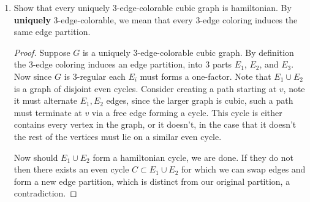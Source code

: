 \documentclass[12pt]{article}
\renewcommand{\emph}[1]{\textsf{\textbf{#1}}}
\begin{document}
\begin{enumerate}
\begin{proof}
		There exists both types of arcs $(v, v_i)$ or $(v_i, v)$ incident to vertex $v$. Now consider the arc of the form $(v_{j}, v)$ with maximal $j$. If $j = n$ then we append $v$ to the induced hamiltonian path and from a new hamiltonian path for $T$. Otherwise there must exists an arc of the form $(v, v_{j + 1})$, in which case we form the following hamiltonian path on $T$, 
		\begin{equation*}
			v_0, \dots v_j, v, v_{j + 1}, \dots v_n. 
		\end{equation*}
	\end{proof}
	\newpage
	
	
	\item Show that every uniquely 3-edge-colorable cubic graph is hamiltonian. By \emph{uniquely} 3-edge-colorable, we mean that every 3-edge coloring induces the same edge partition.
	\begin{proof} Suppose $G$ is a uniquely 3-edge-colorable cubic graph. By definition the  3-edge coloring induces an edge partition, into 3 parts $E_1$, $E_2$, and  $E_3$. Now since $G$ is 3-regular each $E_i$ must forms a one-factor. Note that $E_1 \cup E_2$ is a graph of disjoint even cycles. Consider creating a path starting at $v$, note it must alternate $E_1, E_2$ edges, since the larger graph is cubic, such a path must terminate at $v$ via a free edge forming a cycle. This cycle is either contains every vertex in the graph, or it doesn't, in the case that it doesn't the rest of the vertices must lie on a similar even cycle. 

		Now should $E_1 \cup E_2$ form a hamiltonian cycle, we are done. If they do not then there exists an even cycle $C \subset E_1 \cup E_2$ for which we can swap edges and form a new edge partition, which is distinct from our original partition, a contradiction. 
 		
	\end{proof}
 

	\newpage
	

\end{enumerate}
\end{document}
